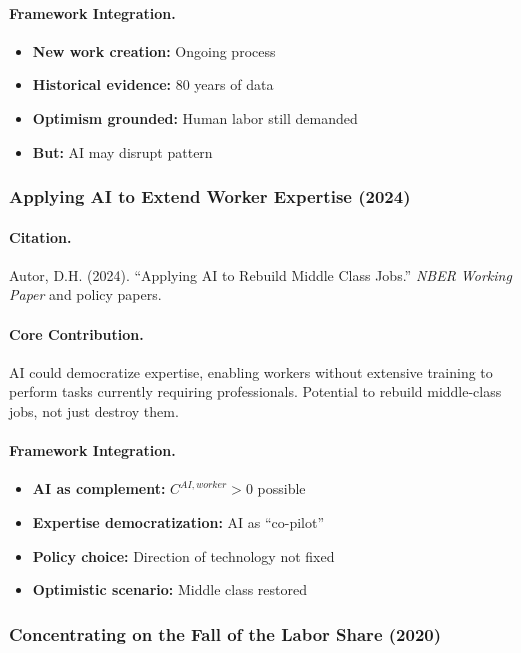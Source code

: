 \documentclass[12pt,a4paper]{article}
\begin{document}
\paragraph{Framework Integration.}
\begin{itemize}
  \item \textbf{New work creation:} Ongoing process
  \item \textbf{Historical evidence:} 80 years of data
  \item \textbf{Optimism grounded:} Human labor still demanded
  \item \textbf{But:} AI may disrupt pattern
\end{itemize}

\subsubsection{Applying AI to Extend Worker Expertise (2024)}

\paragraph{Citation.}
Autor, D.H. (2024). ``Applying AI to Rebuild Middle Class Jobs.''
\emph{NBER Working Paper} and policy papers.

\paragraph{Core Contribution.}
AI could democratize expertise, enabling workers without extensive
training to perform tasks currently requiring professionals.
Potential to rebuild middle-class jobs, not just destroy them.

\paragraph{Framework Integration.}
\begin{itemize}
  \item \textbf{AI as complement:} $C^{AI,worker} > 0$ possible
  \item \textbf{Expertise democratization:} AI as ``co-pilot''
  \item \textbf{Policy choice:} Direction of technology not fixed
  \item \textbf{Optimistic scenario:} Middle class restored
\end{itemize}

\subsubsection{Concentrating on the Fall of the Labor Share (2020)}
\end{document}
